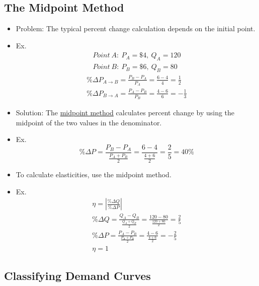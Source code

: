 \subsection{The Midpoint Method}

\begin{itemize}

	\item Problem: The typical percent change calculation depends on the initial point.
	
	\item Ex.
		\begin{gather*}
		Point \ A: \ P_A = \$4, \ Q_A = 120 \\
		Point \ B: \ P_B = \$6, \ Q_B = 80
		\end{gather*}
		\begin{gather*}
		\% \Delta P_{A \rightarrow B} = \frac{P_B - P_A}{P_A} = \frac{6 - 4}{4} = \frac{1}{2} \\
		\% \Delta P_{B \rightarrow A} = \frac{P_A - P_B}{P_B} = \frac{4 - 6}{6} = -\frac{1}{3}
		\end{gather*}
	
	\item Solution: The \underline{midpoint method} calculates percent change by using the midpoint of the two values in the denominator. 
	
	\item Ex. \[ \% \Delta P = \frac{P_B - P_A}{\frac{P_A + P_B}{2}} = \frac{6 - 4}{\frac{4 + 6}{2}}  = \frac{2}{5} = 40\% \]
	
	\item To calculate elasticities, use the midpoint method.
	
	\item Ex. 
	\begin{gather*}
	\eta = \left| \frac{\% \Delta Q}{\% \Delta P} \right| \\
	\% \Delta Q = \frac{Q_A - Q_B}{\frac{Q_A + Q_B}{2}} = \frac{120 - 80}{\frac{120 + 80}{2}} = \frac{2}{5} \\
	\% \Delta P = \frac{P_A - P_B}{\frac{P_A + P_B}{2}} = \frac{4 - 6}{\frac{4 + 6}{2}} = -\frac{2}{5} \\
	\eta = 1
	\end{gather*}
		
\end{itemize}



\subsection{Classifying Demand Curves}

